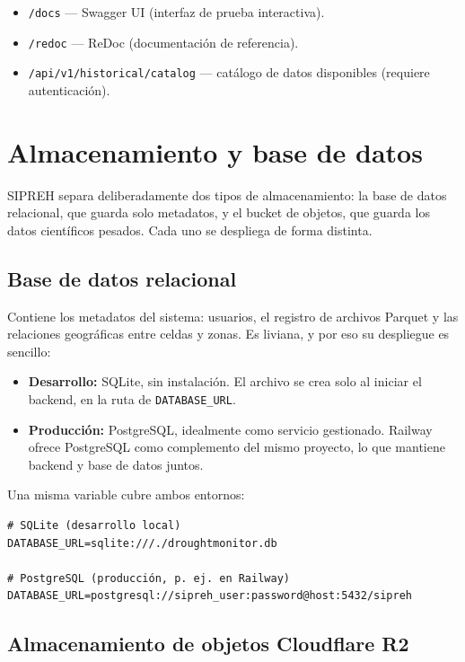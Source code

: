 \begin{itemize}
    \item \texttt{/docs} --- Swagger UI (interfaz de prueba interactiva).
    \item \texttt{/redoc} --- ReDoc (documentación de referencia).
    \item \texttt{/api/v1/historical/catalog} --- catálogo de datos disponibles (requiere autenticación).
\end{itemize}

\section{Almacenamiento y base de datos}
\label{sec:deploy_db}

SIPREH separa deliberadamente dos tipos de almacenamiento: la base de datos relacional, que guarda solo metadatos, y el bucket de objetos, que guarda los datos científicos pesados. Cada uno se despliega de forma distinta.

\subsection*{Base de datos relacional}

Contiene los metadatos del sistema: usuarios, el registro de archivos Parquet y las relaciones geográficas entre celdas y zonas. Es liviana, y por eso su despliegue es sencillo:

\begin{itemize}
    \item \textbf{Desarrollo:} SQLite, sin instalación. El archivo se crea solo al iniciar el backend, en la ruta de \texttt{DATABASE\_URL}.
    \item \textbf{Producción:} PostgreSQL, idealmente como servicio gestionado. Railway ofrece PostgreSQL como complemento del mismo proyecto, lo que mantiene backend y base de datos juntos.
\end{itemize}

\begin{example}
Una misma variable cubre ambos entornos:
\begin{verbatim}
# SQLite (desarrollo local)
DATABASE_URL=sqlite:///./droughtmonitor.db

# PostgreSQL (producción, p. ej. en Railway)
DATABASE_URL=postgresql://sipreh_user:password@host:5432/sipreh
\end{verbatim}
\end{example}

\subsection*{Almacenamiento de objetos Cloudflare R2}

